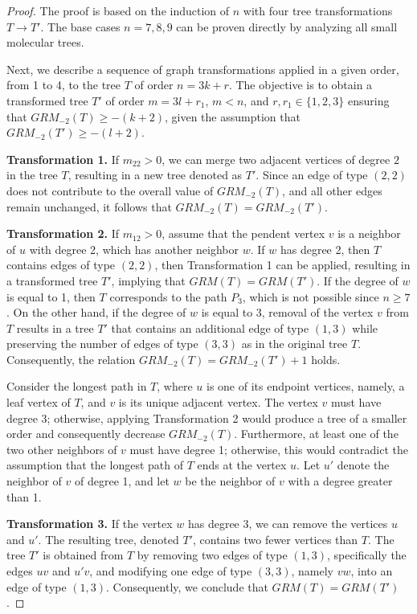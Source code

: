 \documentclass[preprint,12pt]{elsarticle}
\begin{document}
\begin{proof}
The proof is based on the induction of $n$ with four tree transformations $T \rightarrow T'$. 
The base cases $n = 7, 8, 9$  can be proven directly by analyzing all small molecular trees.


Next, we describe a sequence of graph transformations applied in a given order, from 1 to 4, to the tree $T$ of order $n=3k+r$. The objective is to obtain a transformed tree $T'$ of order $m=3l+r_1$, $m<n$, and $r,r_1\in\{1,2,3\}$ ensuring that $GRM_{-2}(T) \geq -(k+2)$, given the assumption that $GRM_{-2}(T') \geq -(l+2)$.

\medskip

{\bf Transformation 1.} If $m_{22} > 0$, we can merge two adjacent vertices of degree $2$ in the tree $T$, resulting in a new tree denoted as $T'$. Since an edge of type $(2,2)$ does not contribute to the overall value of $GRM_{-2} (T)$, and all other edges remain unchanged, it follows that $GRM_{-2} (T) = GRM_{-2} (T')$.


\medskip

{\bf Transformation 2.} 
If $m_{12} > 0$, assume that the pendent vertex $v$ is a neighbor of $u$ with degree 2, which has another neighbor $w$.
If $w$ has degree 2, then $T$ contains edges of type $(2, 2)$, then Transformation 1 can be applied, resulting in a transformed tree $T'$,  implying that $GRM(T) = GRM(T')$.
If the degree of $w$ is equal to 1, then $T$ corresponds to the path $P_3$, which is not possible since $n \geq 7$.
On the other hand, if the degree of $w$ is equal to 3, removal of the vertex $v$ from $T$ results in a tree $T'$ that contains an additional edge of type $(1,3)$ while preserving the number of edges of type $(3,3)$ as in the original tree $T$. Consequently, the relation $GRM_{-2}(T) = GRM_{-2}(T') + 1$ holds.
\medskip

Consider the longest path in $T$, where $u$ is one of its endpoint vertices, namely, a leaf vertex of $T$, and $v$ is its unique adjacent vertex. The vertex $v$ must have degree 3; otherwise, applying Transformation 2 would produce a tree of a smaller order and consequently decrease $GRM_{-2} (T)$.
Furthermore, at least one of the two other neighbors of $v$ must have degree 1; otherwise, this would contradict the assumption that the longest path of $T$ ends at the vertex $u$. Let $u'$ denote the neighbor of $v$ of degree 1, and let $w$ be the neighbor of $v$ with a degree greater than 1.
\medskip


{\bf Transformation 3.} If the vertex $w$ has degree 3, we can remove the vertices $u$ and $u'$. The resulting tree, denoted $T'$, contains two fewer vertices than $T$. The tree $T'$ is obtained from $T$ by removing two edges of type $(1,3)$, specifically the edges $uv$ and $u'v$, and modifying one edge of type $(3,3)$, namely $vw$, into an edge of type $(1,3)$. Consequently, we conclude that $GRM(T) = GRM(T')$.


\end{proof}
\end{document}
